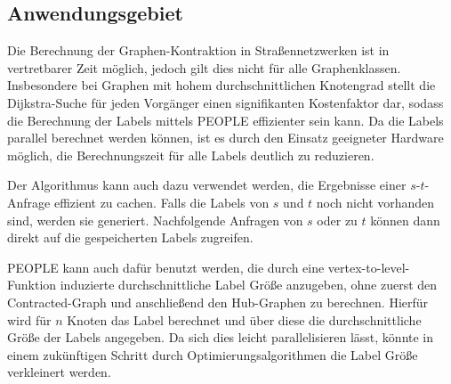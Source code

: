 \subsection{Anwendungsgebiet}

Die Berechnung der Graphen-Kontraktion in Straßennetzwerken ist in vertretbarer Zeit möglich, jedoch gilt dies nicht für alle Graphenklassen. Insbesondere bei Graphen mit hohem durchschnittlichen Knotengrad stellt die Dijkstra-Suche für jeden Vorgänger einen signifikanten Kostenfaktor dar, sodass die Berechnung der Labels mittels PEOPLE effizienter sein kann.
Da die Labels parallel berechnet werden können, ist es durch den Einsatz geeigneter Hardware möglich, die Berechnungszeit für alle Labels deutlich zu reduzieren.

Der Algorithmus kann auch dazu verwendet werden, die Ergebnisse einer $s$-$t$-Anfrage effizient zu cachen.
Falls die Labels von $s$ und $t$ noch nicht vorhanden sind, werden sie generiert.
Nachfolgende Anfragen von $s$ oder zu $t$ können dann direkt auf die gespeicherten Labels zugreifen.

PEOPLE kann auch dafür benutzt werden, die durch eine vertex-to-level-Funktion induzierte durchschnittliche Label Größe anzugeben, ohne zuerst den Contracted-Graph und anschließend den Hub-Graphen zu berechnen.
Hierfür wird für $n$ Knoten das Label berechnet und über diese die durchschnittliche Größe der Labels angegeben.
Da sich dies leicht parallelisieren lässt, könnte in einem zukünftigen Schritt durch Optimierungsalgorithmen die Label Größe verkleinert werden.
